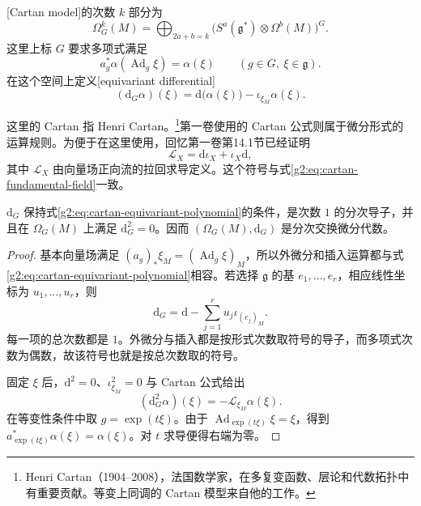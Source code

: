 \begin{definition}\label{g2:def:cartan-complex}
	[Cartan model]的次数 \(k\) 部分为
	\[
		\Omega_G^k(M)=\bigoplus_{2a+b=k}\bigl(S^a(\mathfrak g^*)\otimes\Omega^b(M)\bigr)^G.
	\]
	这里上标 \(G\) 要求多项式满足
	\begin{equation}\label{g2:eq:cartan-equivariant-polynomial}
		a_g^*\alpha(\operatorname{Ad}_g\xi)=\alpha(\xi)
		\qquad(g\in G,\ \xi\in\mathfrak g).
	\end{equation}
	在这个空间上定义[equivariant differential]
	\begin{equation}\label{g2:eq:cartan-differential}
		(\mathrm d_G\alpha)(\xi)=\mathrm d\bigl(\alpha(\xi)\bigr)-\iota_{\xi_M}\alpha(\xi).
	\end{equation}
\end{definition}

这里的 Cartan 指 Henri Cartan。\footnote{Henri Cartan（1904--2008），法国数学家，在多复变函数、层论和代数拓扑中有重要贡献。等变上同调的 Cartan 模型来自他的工作。}第一卷使用的 Cartan 公式则属于微分形式的运算规则。为便于在这里使用，回忆第一卷第14.1节已经证明
\[
	\mathcal L_X=\mathrm d\iota_X+\iota_X\mathrm d,
\]
其中 \(\mathcal L_X\) 由向量场正向流的拉回求导定义。这个符号与式\eqref{g2:eq:cartan-fundamental-field}一致。

\begin{proposition}\label{g2:prop:cartan-is-complex}
	\(\mathrm d_G\) 保持式\eqref{g2:eq:cartan-equivariant-polynomial}的条件，是次数 \(1\) 的分次导子，并且在 \(\Omega_G(M)\) 上满足 \(\mathrm d_G^2=0\)。因而 \((\Omega_G(M),\mathrm d_G)\) 是分次交换微分代数。
\end{proposition}
\begin{proof}
	基本向量场满足 \((a_g)_*\xi_M=(\operatorname{Ad}_g\xi)_M\)，所以外微分和插入运算都与式\eqref{g2:eq:cartan-equivariant-polynomial}相容。若选择 \(\mathfrak g\) 的基 \(e_1,\ldots,e_r\)，相应线性坐标为 \(u_1,\ldots,u_r\)，则
	\[
		\mathrm d_G=\mathrm d-\sum_{j=1}^r u_j\iota_{(e_j)_M}.
	\]
	每一项的总次数都是 \(1\)。外微分与插入都是按形式次数取符号的导子，而多项式次数为偶数，故该符号也就是按总次数取的符号。

	固定 \(\xi\) 后，\(\mathrm d^2=0\)、\(\iota_{\xi_M}^2=0\) 与 Cartan 公式给出
	\[
		(\mathrm d_G^2\alpha)(\xi)=-\mathcal L_{\xi_M}\alpha(\xi).
	\]
	在等变性条件中取 \(g=\exp(t\xi)\)。由于 \(\operatorname{Ad}_{\exp(t\xi)}\xi=\xi\)，得到 \(a_{\exp(t\xi)}^*\alpha(\xi)=\alpha(\xi)\)。对 \(t\) 求导便得右端为零。
\end{proof}

